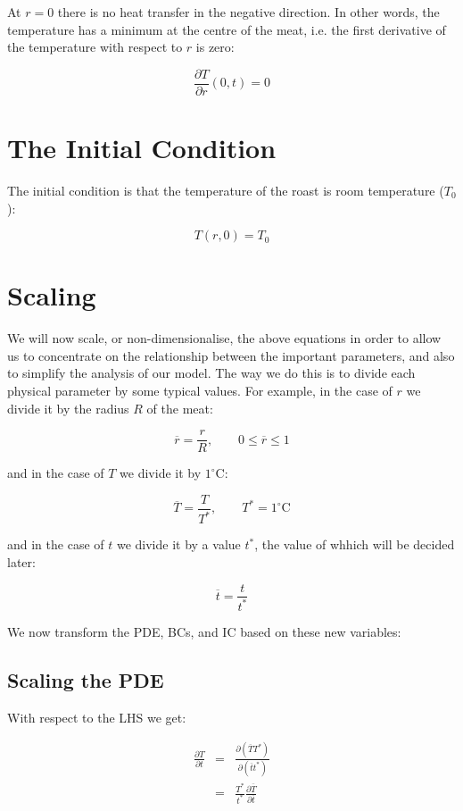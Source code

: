 \documentclass{report}
\begin{document}
At $r = 0$ there is no heat transfer in the negative direction. In other words, the temperature has a 
minimum at the centre of the meat, i.e. the first derivative of the temperature with respect to $r$ is 
zero:\bigskip

\[ \frac{\partial T}{\partial r}(0, t) = 0 \]




\section{The Initial Condition}

The initial condition is that the temperature of the roast is room temperature ($T_0$):\bigskip

\[ T(r, 0) = T_0 \]




\section{Scaling}

We will now scale, or non-dimensionalise, the above equations in order to allow us to concentrate on the 
relationship between the important parameters, and also to simplify the analysis of our model. The way we 
do this is to divide each physical parameter by some typical values. For example, in the case of $r$ we 
divide it by the radius $R$ of the meat:\bigskip

\[
\overline{r} = \frac{r}{R}, \qquad 0 \leq \overline{r} \leq 1
\]\medskip

and in the case of $T$ we divide it by $1^{\circ}\mathrm{C}$:\bigskip

\[
\overline{T} = \frac{T}{T^*}, \qquad T^* = 1^{\circ}\mathrm{C}
\]\medskip

and in the case of $t$ we divide it by a value $t^*$, the value of whhich will be decided later:\bigskip

\[
\overline{t} = \frac{t}{t^*} 
\]\medskip

We now transform the PDE, BCs, and IC based on these new variables:



\subsection{Scaling the PDE}

With respect to the LHS we get:\bigskip

\begin{eqnarray*} 
\frac{\partial T}{\partial t} 
& = & \frac{\partial (\overline{T} T^*)}{\partial (\overline{t} t^*)} \\
& = & \frac{T^*}{t^*} \frac{\partial \overline{T}}{\partial \overline{t}}
\end{eqnarray*}\medskip
\end{document}
